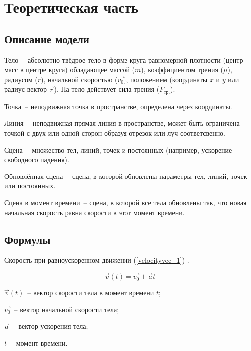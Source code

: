 \chapter{Теоретическая часть}

\section{Описание модели}

Тело~-- абсолютно твёдрое тело в форме круга равномерной плотности
(центр масс в центре круга) обладающее массой (\(m\)), коэффициентом трения (\(\mu\)), 
радиусом (\(r\)), начальной скоростью (\(\vec{v_0}\)), положением (координаты \(x\) и \(y\) или радиус-вектор \(\vec{r}\)).
На тело действует сила трения (\(F_\text{тр.}\)). \TODO

Точка~-- неподвижная точка в пространстве, определена через координаты.

Линия~-- неподвижная прямая линия в пространстве, может быть ограничена точкой с двух или
одной сторон образуя отрезок или луч соответсвенно.

Сцена~-- множество тел, линий, точек и постоянных (например, ускорение свободного падения).

Обновлённая сцена~-- сцена, в которой обновлены параметры тел, линий, точек или постоянных.

Сцена в момент времени~-- сцена, в которой все тела обновлены так, что новая начальная скорость равна скорости в этот момент времени.

\section{Формулы}

Скорость при равноускоренном движении (\ref{velocityvec_1}) \TODO \cite[с.~96]{rowellherbert}.

\begin{equation}\label{velocityvec_1}
  \vec{v}(t) = \vec{v_0} + \vec{a}t
\end{equation}

\begin{Underequation}
  \(\vec{v}(t)\)~-- вектор скорости тела в момент времени \(t\);

  \(\vec{v_0}\)~-- вектор начальной скорости тела;

  \(\vec{a}\)~-- вектор ускорения тела;

  \(t\)~-- момент времени.
\end{Underequation}

